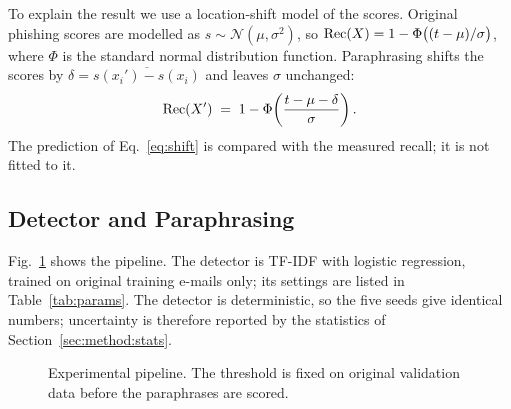 To explain the result we use a location-shift model of the scores. Original phishing scores are modelled as $s\sim\mathcal{N}(\mu,\sigma^2)$, so $\mathrm{Rec}(X)=1-\Phi\bigl((t-\mu)/\sigma\bigr)$, where $\Phi$ is the standard normal distribution function. Paraphrasing shifts the scores by $\delta=\overline{s(x_i')-s(x_i)}$ and leaves $\sigma$ unchanged:
\begin{equation}
  \mathrm{Rec}(X') \;=\; 1-\Phi\!\left(\frac{t-\mu-\delta}{\sigma}\right).
  \label{eq:shift}
\end{equation}
The prediction of Eq.~\eqref{eq:shift} is compared with the measured recall; it is not fitted to it.

\subsection{Detector and Paraphrasing}
\label{sec:method:pipeline}
Fig.~\ref{fig:pipeline} shows the pipeline. The detector is TF-IDF with logistic regression, trained on original training e-mails only; its settings are listed in Table~\ref{tab:params}. The detector is deterministic, so the five seeds give identical numbers; uncertainty is therefore reported by the statistics of Section~\ref{sec:method:stats}.

\begin{figure}[t]
\centering
{}
\caption{Experimental pipeline. The threshold is fixed on original validation data before the paraphrases are scored.}
\label{fig:pipeline}
\end{figure}


